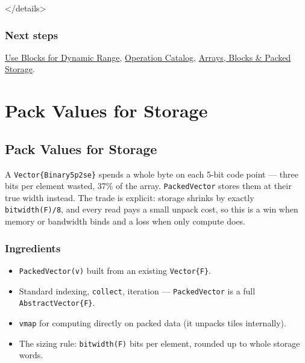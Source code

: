 </details>



\subsection{Next steps}



\label{3807517405601295309-dup3}{}


\href{workflow\_\allowbreak{}blocks.md}{Use Blocks for Dynamic Range}, \href{reference\_\allowbreak{}operations.md}{Operation Catalog}, \href{reference\_\allowbreak{}arrays\_\allowbreak{}blocks\_\allowbreak{}storage.md}{Arrays, Blocks \& Packed Storage}.



\chapter{Pack Values for Storage}


\section{Pack Values for Storage}



\label{4970220927397818605}{}


A \texttt{Vector\{Binary5p2se\}} spends a whole byte on each 5-bit code point — three bits per element wasted, 37\% of the array. \texttt{PackedVector} stores them at their true width instead. The trade is explicit: storage shrinks by exactly \texttt{bitwidth(F)/8}, and every read pays a small unpack cost, so this is a win when memory or bandwidth binds and a loss when only compute does.



\subsection{Ingredients}



\label{13776634711169142479-dup2}{}


\begin{itemize}
\item \texttt{PackedVector(v)} built from an existing \texttt{Vector\{F\}}.


\item Standard indexing, \texttt{collect}, iteration — \texttt{PackedVector} is a full \texttt{AbstractVector\{F\}}.


\item \texttt{vmap} for computing directly on packed data (it unpacks tiles internally).


\item The sizing rule: \texttt{bitwidth(F)} bits per element, rounded up to whole storage words.

\end{itemize}


